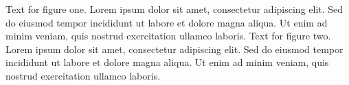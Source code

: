 \documentclass{article}
\begin{document}
\swarmwrapnext{3cm}{3cm}{\rule{3cm}{3cm}}
Text for figure one. Lorem ipsum dolor sit amet, consectetur adipiscing elit.
Sed do eiusmod tempor incididunt ut labore et dolore magna aliqua. Ut enim ad
minim veniam, quis nostrud exercitation ullamco laboris.
\swarmwrapnext{4cm}{5cm}{\rule{4cm}{5cm}}
Text for figure two. Lorem ipsum dolor sit amet, consectetur adipiscing elit.
Sed do eiusmod tempor incididunt ut labore et dolore magna aliqua. Ut enim ad
minim veniam, quis nostrud exercitation ullamco laboris.
\end{document}
